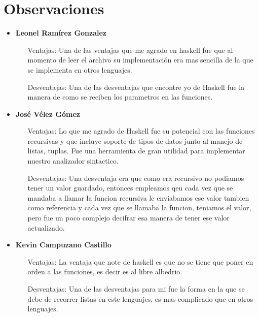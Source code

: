 \documentclass[a4paper,openright,12pt]{report}
\begin{document}
\chapter{Observaciones}
\begin{itemize}
\item \textbf{Leonel Ramírez Gonzalez}
\begin{itemize}
	\item[Ventajas: ]Una de las ventajas que me agrado en haskell fue que al momento de leer el archivo su implementación era mas sencilla de la que se implementa en otros lenguajes.
	\item[Desventajas: ]Una de las desventajas que encontre yo de Haskell fue la manera de como se reciben los parametros en las funciones.
\end{itemize}
\item \textbf{José Vélez Gómez}
\begin{itemize}
	\item[Ventajas: ] Lo que me agrado de Haskell fue su potencial con las funciones recursivas y que incluye soporte de tipos de datos junto al manejo de listas, tuplas. Fue una herramienta de gran utilidad para implementar nuestro analizador sintactico.
	\item[Desventajas: ]Una desventaja era que como era recursivo no podiamos tener un valor guardado, entonces empleamos qeu cada vez que se mandaba a llamar la funcion recursiva le enviabamos ese valor tambien como referencia y cada vez que se llamaba la funcion, teniamos el valor, pero fue un poco complejo decifrar esa manera de tener ese valor actualizado.
\end{itemize}
\item \textbf{Kevin Campuzano Castillo}
\begin{itemize}
	\item[Ventajas: ]La ventaja que note de haskell es que no se tiene que poner en orden a las funciones, es decir es al 	libre albedrio.
	\item[Desventajas: ] Una de las desventajas para mi fue la forma en la que se debe de recorrer listas en este 		lenguajes, es mas complicado que en otros lenguajes.
\end{itemize}
\end{itemize}
\end{document}
